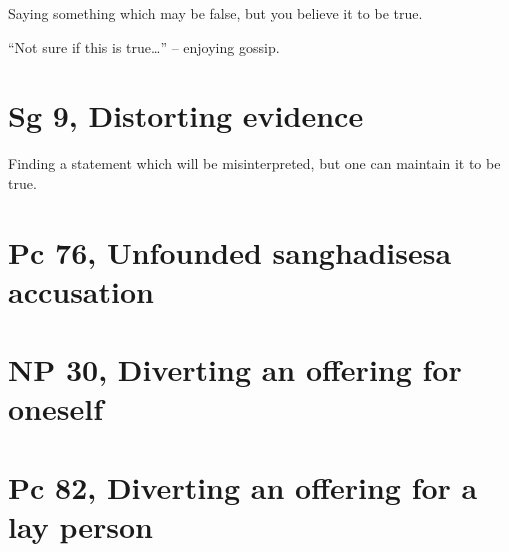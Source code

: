 Saying something which may be false, but you believe it to be true.

``Not sure if this is true\ldots{}'' -- enjoying gossip.

\section{Sg 9, Distorting evidence}

Finding a statement which will be misinterpreted, but one can maintain
it to be true.

\section{Pc 76, Unfounded sanghadisesa accusation}

\section{NP 30, Diverting an offering for oneself}

\section{Pc 82, Diverting an offering for a lay person}

